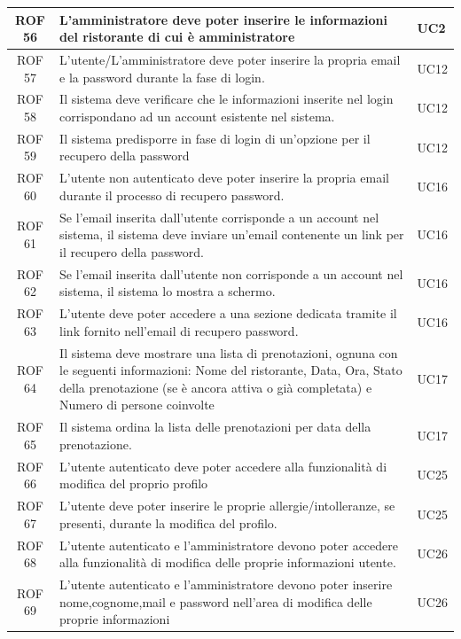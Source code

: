 \documentclass[12pt, oneside]{article}
\begin{document}
\begin{longtable}{|c|p{14cm}|p{2cm}|}
    \hline
    ROF 56 & L'amministratore deve poter inserire le informazioni del ristorante di cui è amministratore & UC2 \\
    \hline
    ROF 57 & L'utente/L'amministratore deve poter inserire la propria email e la password durante la fase di login.  & UC12 \\
    \hline
    ROF 58 & Il sistema deve verificare che le informazioni inserite nel login corrispondano ad un account esistente nel sistema.  & UC12 \\
    \hline
    ROF 59 & Il sistema predisporre in fase di login di un'opzione per il recupero della password  & UC12 \\
    \hline
    ROF 60 & L'utente non autenticato deve poter inserire la propria email durante il processo di recupero password.  & UC16 \\
    \hline
    ROF 61 & Se l'email inserita dall'utente corrisponde a un account nel sistema, il sistema deve inviare un'email contenente un link per il recupero della password.  & UC16 \\
    \hline
    ROF 62 & Se l'email inserita dall'utente non corrisponde a un account nel sistema, il sistema lo mostra a schermo.  & UC16 \\
    \hline
    ROF 63 & L'utente deve poter accedere a una sezione dedicata tramite il link fornito nell'email di recupero password.  & UC16 \\
    \hline
    ROF 64 & Il sistema deve mostrare una lista di prenotazioni, ognuna con le seguenti informazioni:
    Nome del ristorante, Data, Ora, Stato della prenotazione (se è ancora attiva o già completata) e Numero di persone coinvolte & UC17 \\
    \hline
    ROF 65 & Il sistema ordina la lista delle prenotazioni per data della prenotazione.  & UC17 \\
    \hline
    ROF 66 & L'utente autenticato deve poter accedere alla funzionalità di modifica del proprio profilo  & UC25 \\
    \hline
    ROF 67 & L'utente deve poter inserire le proprie allergie/intolleranze, se presenti, durante la modifica del profilo.  & UC25  \\
    \hline
    ROF 68 & L'utente autenticato e l'amministratore devono poter accedere alla funzionalità di modifica delle proprie informazioni utente.  & UC26  \\
    \hline
    ROF 69 & L'utente autenticato e l'amministratore devono poter inserire nome,cognome,mail e password nell'area di  modifica delle proprie informazioni  & UC26  \\

\end{longtable}
\end{document}
